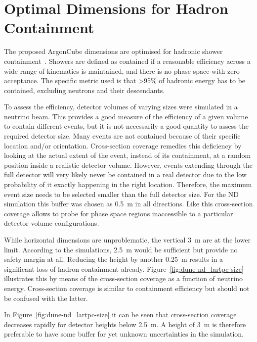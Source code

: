 \documentclass[a4paper]{article}
\begin{document}
	
\section{Optimal Dimensions for Hadron Containment}\label{sec:had_containment}

The proposed ArgonCube dimensions are optimised for hadronic shower containment~\cite{lartpcSizeChris}. 
Showers are defined as contained if a reasonable efficiency across a wide range of kinematics is maintained, and there is no phase space with zero acceptance. 
The specific metric used is that \textgreater95\% of hadronic energy has to be contained, excluding neutrons and their descendants.

To assess the efficiency, detector volumes of varying sizes were simulated in a neutrino beam.
This provides a good measure of the efficiency of a given volume to contain different events, but it is not necessarily a good quantity to assess the required detector size.
Many events are not contained because of their specific location and/or orientation.
Cross-section coverage remedies this deficiency by looking at the actual extent of the event, instead of its containment, at a random position inside a realistic detector volume.
However, events extending through the full detector will very likely never be contained in a real detector due to the low probability of it exactly happening in the right location.
Therefore, the maximum event size needs to be selected smaller than the full detector size.
For the ND simulation this buffer was chosen as \SI{0.5}{\metre} in all directions.
Like this cross-section coverage allows to probe for phase space regions inaccessible to a particular detector volume configurations.


While horizontal dimensions are unproblematic, the vertical \SI{3}{\metre} are at the lower limit.
According to the simulations, \SI{2.5}{\metre} would be sufficient but provide no safety margin at all.
Reducing the height by another \SI{0.25}{\metre} results in a significant loss of hadron containment already.
Figure~\ref{fig:dune-nd_lartpc-size} illustrates this by means of the cross-section coverage as a function of neutrino energy.
Cross-section coverage is similar to containment efficiency but should not be confused with the latter.


In Figure~\ref{fig:dune-nd_lartpc-size} it can be seen that cross-section coverage decreases rapidly for detector heights below \SI{2.5}{\metre}.
A height of \SI{3}{\metre} is therefore preferable to have some buffer for yet unknown uncertainties in the simulation.
\end{document}
